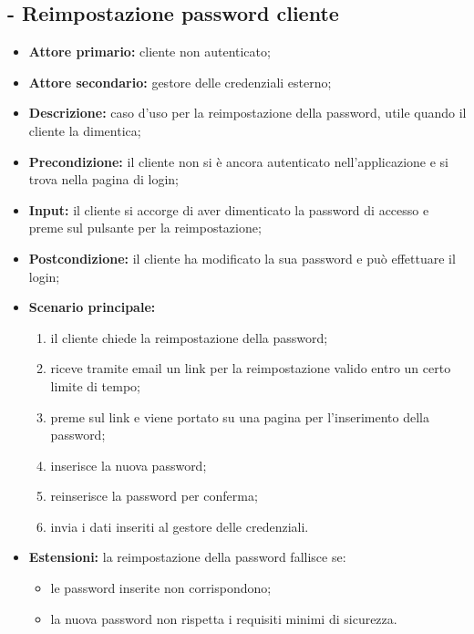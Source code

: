 \stepUserCase
\subsection{ - Reimpostazione password cliente}
\begin{itemize}
    \item \textbf{Attore primario:} cliente non autenticato;
    \item \textbf{Attore secondario:} gestore delle credenziali esterno;
    \item \textbf{Descrizione:} caso d'uso per la reimpostazione della password, utile quando il cliente la dimentica;
    \item \textbf{Precondizione:} il cliente non si è ancora autenticato nell'applicazione e si trova nella pagina di login;
    \item \textbf{Input:} il cliente si accorge di aver dimenticato la password di accesso e preme sul pulsante per la reimpostazione;
    \item \textbf{Postcondizione:} il cliente ha modificato la sua password e può effettuare il login;
    \item \textbf{Scenario principale:}
          \begin{enumerate}
              \item il cliente chiede la reimpostazione della password;
              \item riceve tramite email un link per la reimpostazione valido entro un certo limite di tempo;
              \item preme sul link e viene portato su una pagina per l'inserimento della password;
              \item inserisce la nuova password;
              \item reinserisce la password per conferma;
              \item invia i dati inseriti al gestore delle credenziali.
          \end{enumerate}
    \item \textbf{Estensioni:} la reimpostazione della password fallisce se:
          \begin{itemize}
              \item le password inserite non corrispondono;
              \item la nuova password non rispetta i requisiti minimi di sicurezza.
          \end{itemize}
\end{itemize}

